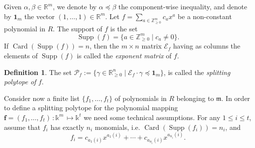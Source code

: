 \documentclass[12pt]{amsart}
\theoremstyle{definition}
\newtheorem{definition}[theorem]{Definition}
\numberwithin{equation}{subsection}
\newcommand{\RR}{\mathbb{R}}
\newcommand{\m}{\mathfrak{m}}
\newcommand{\SP}{\mathcal{P}}
\newcommand{\Card}{\operatorname{Card}}
\newcommand{\E}{\mathcal{E}}
\newcommand{\Supp}{\operatorname{Supp}}
\renewcommand{\!}[1]{{\color{red}\text{\Huge$\star$ }#1}}
\begin{document}
Given $\alpha, \beta \in \RR^m$, we denote by $\alpha \preceq \beta$ the component-wise inequality, and denote by $\boldsymbol{1}_m$ the vector $(1,\ldots,1)\in\RR^m$. Let $f=\sum_{a\in{\mathbb{Z}_{\geq 0}^m}} c_ax^a$ be a non-constant polynomial in $R$. The support of $f$ is the set 
\[\Supp(f)=\{a\in{\mathbb{Z}_{\geq 0}^m} \mid c_a\neq 0\}.\]
If $\Card(\Supp(f))=n$, then the $m\times n$ matrix $\E_f$ having as columns the elements of $\Supp(f)$ is called the \textit{exponent matrix} of $f$.
\begin{definition}\label{def:SpliPolf}
	The set $\SP_f:=\{\gamma \in \RR_{\geq 0}^{n} \mid \E_f \cdot \gamma\preceq \textbf{1}_{m}\}$, is called the \textit{splitting polytope of} $f$.
\end{definition} 
Consider now a finite list $\{f_1, \ldots, f_t\}$ of polynomials in $R$ belonging to $\m$. In order to define a splitting polytope for the polynomial mapping $\boldsymbol{f}=(f_1,\ldots, f_t)\, :\mathbb{k}^m\,\mapsto \mathbb{k}^t$ we need some technical assumptions. For any $1\leq i\leq t$, assume that $f_i$ has exactly $n_i$ monomials, i.e. $\Card(\Supp(f_i))=n_i$, and  
\begin{equation}\label{Eq:monomials_in_f}
	f_i=c_{a_{1}(i)}x^{a_{1}(i)}+\cdots+c_{a_{n_i}(i)}x^{a_{n_i}(i)}.
\end{equation}
\end{document}
